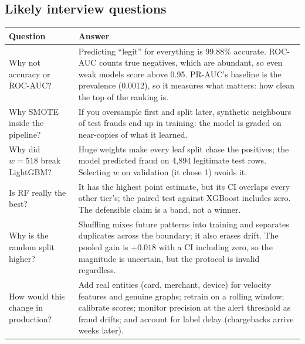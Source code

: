 \documentclass[11pt,a4paper]{article}
\begin{document}
\subsection{Likely interview questions}
{\footnotesize
\begin{center}
\begin{tabular}{@{}P{4.6cm}P{11.2cm}@{}}
\toprule
Question & Answer \\
\midrule
Why not accuracy or ROC-AUC? & Predicting ``legit'' for everything is 99.88\% accurate. ROC-AUC counts true negatives, which are
abundant, so even weak models score above 0.95. PR-AUC's baseline is the prevalence (0.0012), so it
measures what matters: how clean the top of the ranking is. \\
Why SMOTE inside the pipeline? & If you oversample first and split later, synthetic neighbours of test frauds end up in training:
the model is graded on near-copies of what it learned. \\
Why did $w = 518$ break LightGBM? & Huge weights make every leaf split chase the positives; the model predicted fraud on 4,894
legitimate test rows. Selecting $w$ on validation (it chose 1) avoids it. \\
Is RF really the best? & It has the highest point estimate, but its CI overlaps every other tier's; the paired test
against XGBoost includes zero. The defensible claim is a band, not a winner. \\
Why is the random split higher? & Shuffling mixes future patterns into training and separates duplicates across the boundary; it
also erases drift. The pooled gain is $+0.018$ with a CI including zero, so the magnitude is uncertain,
but the protocol is invalid regardless. \\
How would this change in production? & Add real entities (card, merchant, device) for velocity features and genuine graphs; retrain on
a rolling window; calibrate scores; monitor precision at the alert threshold as fraud drifts; and
account for label delay (chargebacks arrive weeks later). \\
\bottomrule
\end{tabular}
\end{center}
}

\end{document}

